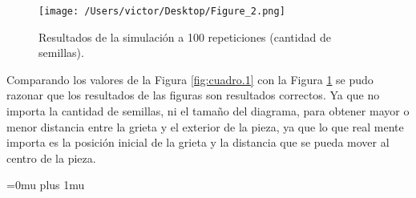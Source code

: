 \documentclass{article}
\begin{document}
\begin{figure}[H]
\begin{center}
	\texttt{[image: /Users/victor/Desktop/Figure\_2.png]}
	\caption{ Resultados de la simulación a 100 repeticiones (cantidad de semillas).}
	\label{fig:cuadro.2}
\end{center}
\end{figure}
Comparando los valores de la Figura \ref{fig:cuadro.1}  con la Figura \ref{fig:cuadro.2} se pudo razonar que los resultados de las figuras son resultados correctos. Ya que no importa la cantidad de semillas, ni el tamaño del diagrama, para obtener mayor o menor distancia entre la grieta y el exterior de la pieza, ya que lo que real mente importa es la posición inicial de la grieta y la distancia que se pueda mover al centro de la pieza.

\Urlmuskip=0mu plus 1mu\relax


\end{document}
